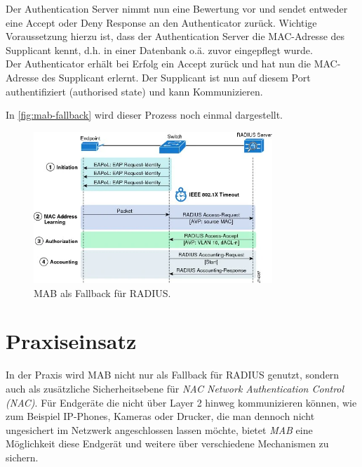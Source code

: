 \documentclass[conference]{IEEEtran}
\begin{document}
Der Authentication Server nimmt nun eine Bewertung vor und sendet entweder eine Accept oder Deny Response an den Authenticator zurück. Wichtige Voraussetzung hierzu ist, dass der Authentication Server die MAC-Adresse des Supplicant kennt, d.h. in einer Datenbank o.ä. zuvor eingepflegt wurde.\\

Der Authenticator erhält bei Erfolg ein Accept zurück und hat nun die MAC-Adresse des Supplicant erlernt. Der Supplicant ist nun auf diesem Port authentifiziert (authorised state) und kann Kommunizieren.

In \autoref{fig:mab-fallback} wird dieser Prozess noch einmal dargestellt.\\

\begin{figure}[hbt]
	\centering
	\includegraphics[width=9cm]{figures/mab-fallback}
	\caption{MAB als Fallback für RADIUS.}
	\label{fig:mab-fallback}
\end{figure}

%

\section{Praxiseinsatz}
In der Praxis wird MAB nicht nur als Fallback für RADIUS genutzt, sondern auch als zusätzliche Sicherheitsebene für \emph{NAC Network Authentication Control (NAC)}. Für Endgeräte die nicht über Layer 2 hinweg kommunizieren können, wie zum Beispiel IP-Phones, Kameras oder Drucker, die man dennoch nicht ungesichert im Netzwerk angeschlossen lassen möchte, bietet \emph{MAB} eine Möglichkeit diese Endgerät und weitere über verschiedene Mechanismen zu sichern. 

\cite{mab-cisco}
\cite{mab-non-cisco}
\cite{mab-deployment-guide}
\end{document}
